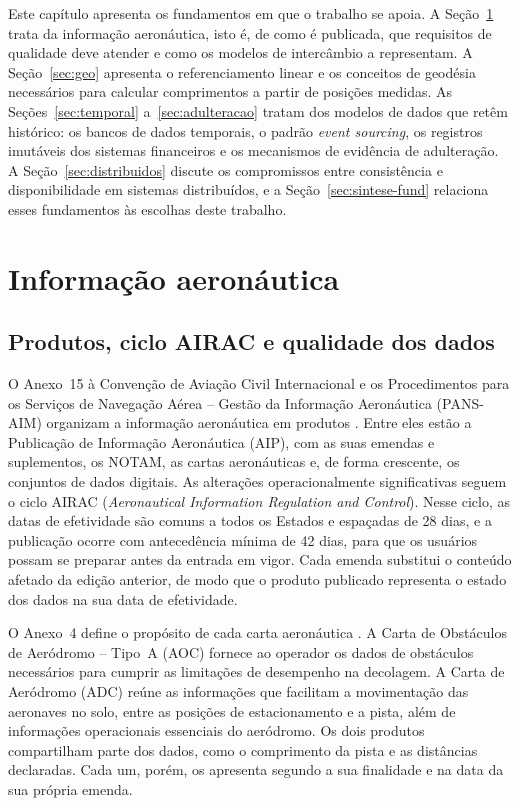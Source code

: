 Este capítulo apresenta os fundamentos em que o trabalho se apoia. A Seção~\ref{sec:info-aero} trata da informação aeronáutica, isto é, de como é publicada, que requisitos de qualidade deve atender e como os modelos de intercâmbio a representam. A Seção~\ref{sec:geo} apresenta o referenciamento linear e os conceitos de geodésia necessários para calcular comprimentos a partir de posições medidas. As Seções~\ref{sec:temporal} a~\ref{sec:adulteracao} tratam dos modelos de dados que retêm histórico: os bancos de dados temporais, o padrão \textit{event sourcing}, os registros imutáveis dos sistemas financeiros e os mecanismos de evidência de adulteração. A Seção~\ref{sec:distribuidos} discute os compromissos entre consistência e disponibilidade em sistemas distribuídos, e a Seção~\ref{sec:sintese-fund} relaciona esses fundamentos às escolhas deste trabalho.

\section{Informação aeronáutica}\label{sec:info-aero}

\subsection{Produtos, ciclo AIRAC e qualidade dos dados}\label{sec:produtos}

O Anexo~15 à Convenção de Aviação Civil Internacional e os Procedimentos para os Serviços de Navegação Aérea -- Gestão da Informação Aeronáutica (PANS-AIM) organizam a informação aeronáutica em produtos \cite{icao2018anexo15,icao2018pansaim}. Entre eles estão a Publicação de Informação Aeronáutica (AIP), com as suas emendas e suplementos, os NOTAM, as cartas aeronáuticas e, de forma crescente, os conjuntos de dados digitais. As alterações operacionalmente significativas seguem o ciclo AIRAC (\textit{Aeronautical Information Regulation and Control}). Nesse ciclo, as datas de efetividade são comuns a todos os Estados e espaçadas de 28 dias, e a publicação ocorre com antecedência mínima de 42 dias, para que os usuários possam se preparar antes da entrada em vigor. Cada emenda substitui o conteúdo afetado da edição anterior, de modo que o produto publicado representa o estado dos dados na sua data de efetividade.

O Anexo~4 define o propósito de cada carta aeronáutica \cite{icao_anexo4}. A Carta de Obstáculos de Aeródromo -- Tipo~A (AOC) fornece ao operador os dados de obstáculos necessários para cumprir as limitações de desempenho na decolagem. A Carta de Aeródromo (ADC) reúne as informações que facilitam a movimentação das aeronaves no solo, entre as posições de estacionamento e a pista, além de informações operacionais essenciais do aeródromo. Os dois produtos compartilham parte dos dados, como o comprimento da pista e as distâncias declaradas. Cada um, porém, os apresenta segundo a sua finalidade e na data da sua própria emenda.

